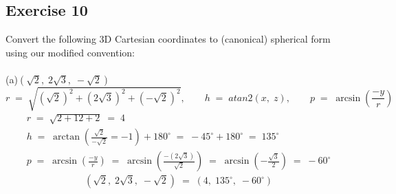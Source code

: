 \documentclass[12pt, a4paper]{article}
\begin{document}
\subsection*{Exercise 10}
Convert the following 3D Cartesian coordinates to (canonical) spherical form using our modified convention:\\\\
	(a)\quad$\left(\sqrt{2},\;2\sqrt{3},\;-\sqrt{2}\right)$
		\begin{equation}
			\tag*{}
				r\;=\;\sqrt
				{
					\left(\sqrt{2}\right)^2+
					\left(2\sqrt{3}\right)^2+
					\left(-\sqrt{2}\right)^2
				}, \qquad
				h\;=\;atan2(x,\;z), \qquad
				p\;=\;\arcsin\left(\frac{-y}{r}\right)
		\end{equation}
		\begin{gather}
			\tag*{}
				r\;=\;\sqrt{2+12+2}\;=\;4\\
			\tag*{}
				h\;=\;\arctan\left(\frac
				{
				\sqrt{2}}{-\sqrt{2}
				}
				=-1\right)+180^\circ
				\;=\;-45^\circ+180^\circ\;=\;135^\circ\\
			\tag*{}
				p\;=\;\arcsin\left(
					\frac{-y}{r}
				\right)\;=\;\arcsin\left(\frac{
					-\left(
					2\sqrt{3}\right)
				}{\sqrt{2}}\right)\;=\;\arcsin\left(-\frac{
					\sqrt{3}}{2
				}\right)\;=\;-60^\circ
		\end{gather}
		\begin{equation}
			\tag*{}
				\left(\sqrt{2},\;2\sqrt{3},\;-\sqrt{2}\right)
				\;=\;(4,\;135^\circ,\;-60^\circ)
		\end{equation}
\end{document}
